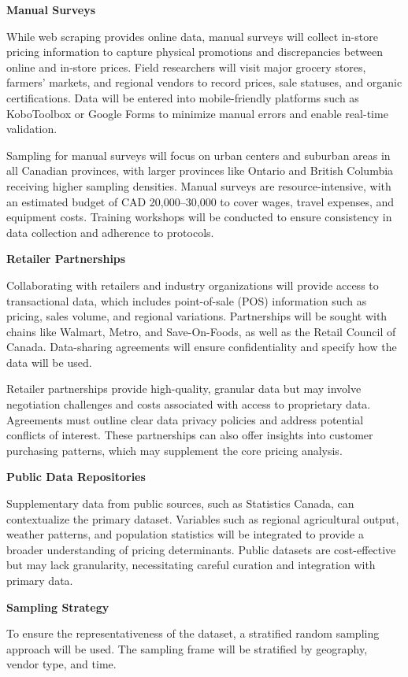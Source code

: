 \documentclass[
  letterpaper,
  DIV=11,
  numbers=noendperiod]{scrartcl}
\begin{document}
\textbf{Manual Surveys}

While web scraping provides online data, manual surveys will collect
in-store pricing information to capture physical promotions and
discrepancies between online and in-store prices. Field researchers will
visit major grocery stores, farmers' markets, and regional vendors to
record prices, sale statuses, and organic certifications. Data will be
entered into mobile-friendly platforms such as KoboToolbox or Google
Forms to minimize manual errors and enable real-time validation.

Sampling for manual surveys will focus on urban centers and suburban
areas in all Canadian provinces, with larger provinces like Ontario and
British Columbia receiving higher sampling densities. Manual surveys are
resource-intensive, with an estimated budget of CAD 20,000--30,000 to
cover wages, travel expenses, and equipment costs. Training workshops
will be conducted to ensure consistency in data collection and adherence
to protocols.

\textbf{Retailer Partnerships}

Collaborating with retailers and industry organizations will provide
access to transactional data, which includes point-of-sale (POS)
information such as pricing, sales volume, and regional variations.
Partnerships will be sought with chains like Walmart, Metro, and
Save-On-Foods, as well as the Retail Council of Canada. Data-sharing
agreements will ensure confidentiality and specify how the data will be
used.

Retailer partnerships provide high-quality, granular data but may
involve negotiation challenges and costs associated with access to
proprietary data. Agreements must outline clear data privacy policies
and address potential conflicts of interest. These partnerships can also
offer insights into customer purchasing patterns, which may supplement
the core pricing analysis.

\textbf{Public Data Repositories}

Supplementary data from public sources, such as Statistics Canada, can
contextualize the primary dataset. Variables such as regional
agricultural output, weather patterns, and population statistics will be
integrated to provide a broader understanding of pricing determinants.
Public datasets are cost-effective but may lack granularity,
necessitating careful curation and integration with primary data.

\textbf{Sampling Strategy}

To ensure the representativeness of the dataset, a stratified random
sampling approach will be used. The sampling frame will be stratified by
geography, vendor type, and time.
\end{document}
